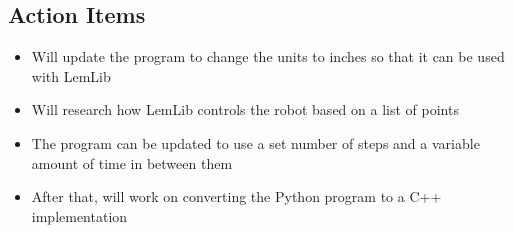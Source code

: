 \subsection{Action Items}
\begin{itemize}
    \item Will update the program to change the units to inches so that it can be used with LemLib
    \item Will research how LemLib controls the robot based on a list of points
    \item The program can be updated to use a set number of steps and a variable amount of time in between them
    \item After that, will work on converting the Python program to a C++ implementation
\end{itemize}